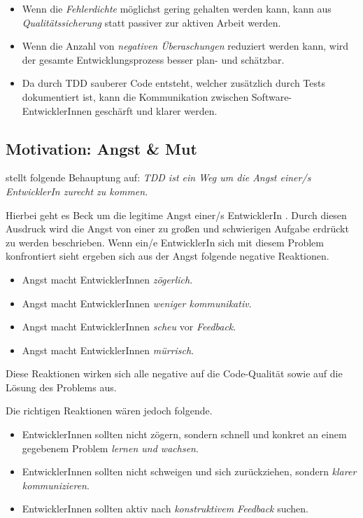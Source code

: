 \begin{itemize}
  \item Wenn die \textit{Fehlerdichte} möglichst gering gehalten werden kann, kann aus \textit{Qualitätssicherung} statt passiver zur aktiven Arbeit werden.
  \item Wenn die Anzahl von \textit{negativen Überaschungen} reduziert werden kann, wird der gesamte Entwicklungsprozess besser plan- und schätzbar.
  \item Da durch TDD sauberer Code entsteht, welcher zusätzlich durch Tests dokumentiert ist, kann die Kommunikation zwischen Software-EntwicklerInnen geschärft und klarer werden.
\end{itemize}
\subsection{Motivation: Angst {\&} Mut}
\cite{Beck:2003} stellt folgende Behauptung auf: \newline
\textit{TDD ist ein Weg um die Angst einer/s EntwicklerIn zurecht zu kommen}.

Hierbei geht es Beck um die legitime Angst einer/s EntwicklerIn . Durch diesen Ausdruck wird die Angst von einer zu großen und schwierigen Aufgabe erdrückt zu werden beschrieben.
Wenn ein/e EntwicklerIn sich mit diesem Problem konfrontiert sieht ergeben sich aus der Angst folgende negative Reaktionen.
\begin{itemize}
  \item Angst macht EntwicklerInnen \textit{zögerlich}.
  \item Angst macht EntwicklerInnen \textit{weniger kommunikativ}.
  \item Angst macht EntwicklerInnen \textit{scheu} vor \textit{Feedback}.
  \item Angst macht EntwicklerInnen \textit{mürrisch}.
\end{itemize}
Diese Reaktionen wirken sich alle negative auf die Code-Qualität sowie auf die Lösung des Problems aus.

Die richtigen Reaktionen wären jedoch folgende.
\begin{itemize}
  \item EntwicklerInnen sollten nicht zögern, sondern schnell und konkret an einem gegebenem Problem \textit{lernen und wachsen}.
  \item EntwicklerInnen sollten nicht schweigen und sich zurückziehen, sondern \textit{klarer kommunizieren}.
  \item EntwicklerInnen sollten aktiv nach \textit{konstruktivem Feedback} suchen.
\end{itemize}

